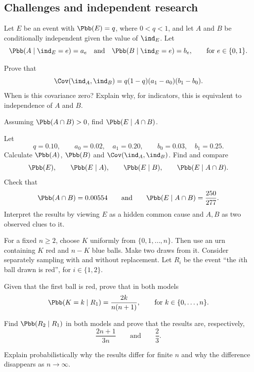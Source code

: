 \subsection*{Challenges and independent research}
\begin{problemstar}
Let $E$ be an event with $\Pbb(E)=q$, where $0<q<1$, and let $A$ and $B$ be
conditionally independent given the value of $\ind_E$. Let
\[
\Pbb(A\mid \ind_E=e)=a_e
\quad\text{and}\quad
\Pbb(B\mid \ind_E=e)=b_e,
\qquad\text{for }e\in\{0,1\}.
\]
\begin{enumeratea}
  \item Prove that
  \[ \Cov(\ind_A,\ind_B)=q(1-q)(a_1-a_0)(b_1-b_0). \]
  When is this covariance zero? Explain why, for indicators, this is equivalent
  to independence of $A$ and $B$.
  \item Assuming $\Pbb(A\cap B)>0$, find $\Pbb(E\mid A\cap B)$.
  \item Let
  \[ q=0.10,\qquad a_0=0.02,\quad a_1=0.20,\qquad b_0=0.03,\quad b_1=0.25. \]
  Calculate $\Pbb(A)$, $\Pbb(B)$ and $\Cov(\ind_A,\ind_B)$. Find and compare
  \[ \Pbb(E),\qquad\Pbb(E\mid A),\qquad\Pbb(E\mid B),\qquad\Pbb(E\mid A\cap B). \]
  Check that
  \[ \Pbb(A\cap B)=0.00554\qquad\text{and}\qquad\Pbb(E\mid A\cap B)=\frac{250}{277}. \]
  Interpret the results by viewing $E$ as a hidden common cause and $A,B$ as two observed clues to it.
\end{enumeratea}
\end{problemstar}
\begin{problemstar}
For a fixed $n\ge2$, choose $K$ uniformly from $\{0,1,\dots,n\}$. Then use an
urn containing $K$ red and $n-K$ blue balls. Make two draws from it.
Consider separately sampling with and without replacement. Let $R_i$ be the event
``the $i$th ball drawn is red'', for $i\in\{1,2\}$.
\begin{enumeratea}
  \item Given that the first ball is red, prove that in both models
  \[ \Pbb(K=k\mid R_1)=\frac{2k}{n(n+1)},\qquad\text{for }k\in\{0,\dots,n\}. \]
  \item Find $\Pbb(R_2\mid R_1)$ in both models and prove that the results are, respectively,
  \[ \frac{2n+1}{3n}\qquad\text{and}\qquad\frac23. \]
  \item Explain probabilistically why the results differ for finite $n$ and why
  the difference disappears as $n\to\infty$.
\end{enumeratea}
\end{problemstar}
